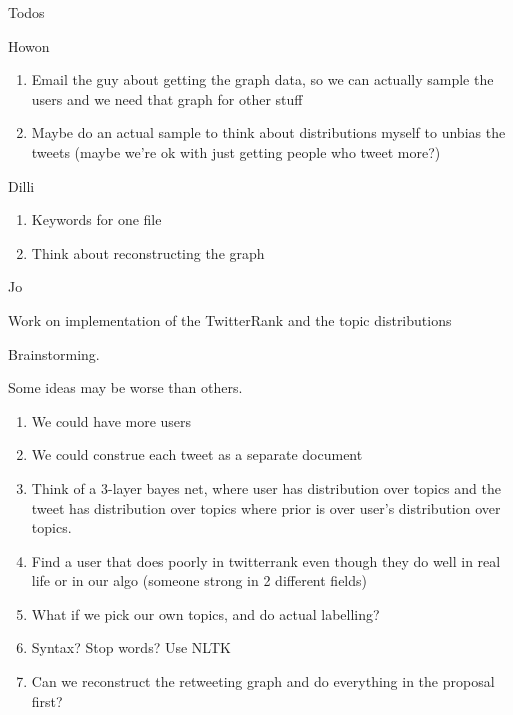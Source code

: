 Todos

Howon

\begin{enumerate}
\item Email the guy about getting the graph data, so we can actually sample the users and we need that graph for other stuff
\item Maybe do an actual sample to think about distributions myself to unbias the tweets (maybe we're ok with just getting people who tweet more?)
\end{enumerate}

Dilli

\begin{enumerate}
\item Keywords for one file
\item Think about reconstructing the graph
\end{enumerate}

Jo

Work on implementation of the TwitterRank and the topic distributions

Brainstorming.

Some ideas may be worse than others.

\begin{enumerate}
\item We could have more users
\item We could construe each tweet as a separate document
\item Think of a 3-layer bayes net, where user has distribution over topics and the tweet has distribution over topics where prior is over user's distribution over topics.
\item Find a user that does poorly in twitterrank even though they do well in real life or in our algo (someone strong in 2 different fields)
\item What if we pick our own topics, and do actual labelling?
\item Syntax? Stop words? Use NLTK
\item Can we reconstruct the retweeting graph and do everything in the proposal first?
\end{enumerate}
